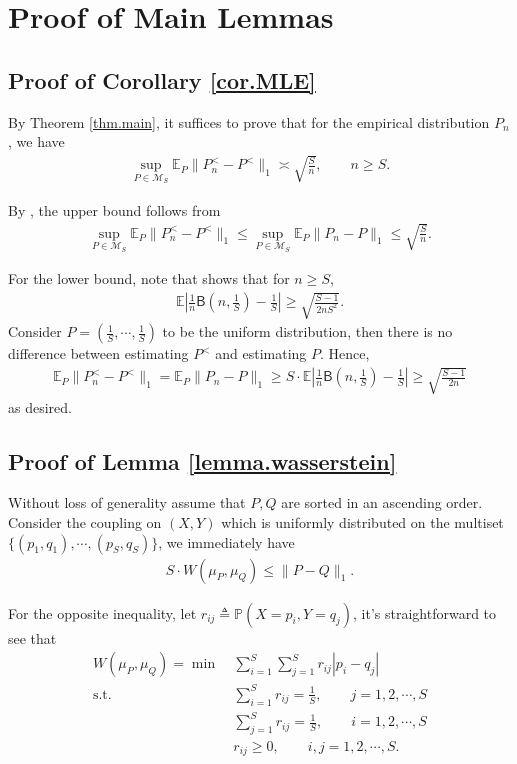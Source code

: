 \documentclass[final,12pt]{colt2018} %
\def \bP {\mathbb{P}}
\def \bE {\mathbb{E}}
\newcommand{\calM}{{\mathcal{M}}}
\begin{document}
\section{Proof of Main Lemmas}
\subsection{Proof of Corollary \ref{cor.MLE}}
By Theorem \ref{thm.main}, it suffices to prove that for the empirical distribution $P_n$, we have
\begin{align*}
\sup_{P\in \calM_S} \bE_P \|P_n^<-P^<\|_1 \asymp \sqrt{\frac{S}{n}}, \qquad n\ge S.
\end{align*}

By \cite{han2015minimax}, the upper bound follows from 
\begin{align*}
\sup_{P\in \calM_S} \bE_P \|P_n^<-P^<\|_1 \le \sup_{P\in \calM_S} \bE_P \|P_n-P\|_1 \le \sqrt{\frac{S}{n}}.
\end{align*}

For the lower bound, note that \cite[Theorem 1]{berend2013sharp} shows that for $n\ge S$, 
\begin{align*}
\bE \left|\frac{1}{n}\mathsf{B}(n,\frac{1}{S}) - \frac{1}{S}\right| \ge \sqrt{\frac{S-1}{2nS^2}}.
\end{align*}
Consider $P=(\frac{1}{S},\cdots,\frac{1}{S})$ to be the uniform distribution, then there is no difference between estimating $P^<$ and estimating $P$. Hence,
\begin{align*}
\bE_P \|P_n^<-P^<\|_1 = \bE_P \|P_n-P\|_1 \ge S\cdot\bE \left|\frac{1}{n}\mathsf{B}(n,\frac{1}{S}) - \frac{1}{S}\right| \ge \sqrt{\frac{S-1}{2n}}
\end{align*}
as desired. 

\subsection{Proof of Lemma \ref{lemma.wasserstein}}
Without loss of generality assume that $P,Q$ are sorted in an ascending order. Consider the coupling on $(X,Y)$ which is uniformly distributed on the multiset $\{(p_1,q_1),\cdots,(p_S,q_S)\}$, we immediately have
\begin{align*}
S\cdot W(\mu_P,\mu_Q) \le \|P-Q\|_1.
\end{align*}

For the opposite inequality, let $r_{ij}\triangleq \bP(X=p_i, Y=q_j)$, it's straightforward to see that
\begin{align*}
W(\mu_P,\mu_Q) = \min & ~ \sum_{i=1}^S\sum_{j=1}^S r_{ij}|p_i-q_j| \\
\text{s.t.} & ~ \sum_{i=1}^S r_{ij}=\frac{1}{S}, \qquad j=1,2,\cdots,S \\
& ~ \sum_{j=1}^S r_{ij}=\frac{1}{S}, \qquad i=1,2,\cdots,S \\
& ~ r_{ij}\ge 0, \qquad i,j=1,2,\cdots,S.
\end{align*}
\end{document}

